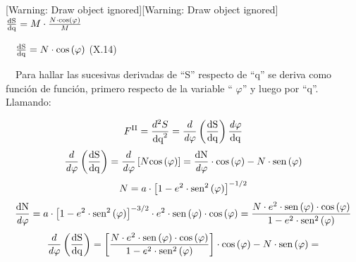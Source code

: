 \documentclass{tufte-book}
\newcommand\normalsubformula[1]{\text{\mathversion{normal}$#1$}}
\begin{document}
[Warning: Draw object ignored][Warning: Draw object ignored]\ \ 
${\frac{\normalsubformula{\text{dS}}}{\normalsubformula{\text{dq}}}=M\cdot
{\frac{N\cdot \text{cos}\left(\varphi \right)}{M}}}$

\ \ 
${\frac{\normalsubformula{\text{dS}}}{\normalsubformula{\text{dq}}}=N\cdot
\text{cos}\left(\varphi \right)}$  (X.14)

\ \ Para hallar las sucesivas derivadas de
{\textquotedblleft}S{\textquotedblright} respecto de
{\textquotedblleft}q{\textquotedblright} se deriva como función de
función, primero respecto de la variable {\textquotedblleft}
${\varphi }${\textquotedblright} y luego por
{\textquotedblleft}q{\textquotedblright}. Llamando:

\begin{equation*}
{F^{{\normalsubformula{\text{II}}}}=\frac{d^{{2}}S}{\normalsubformula{\text{dq}}^{{2}}}=\frac{d}{\mathit{d\varphi
}}\left(\frac{\normalsubformula{\text{dS}}}{\normalsubformula{\text{dq}}}\right)\frac{\mathit{d\varphi
}}{\normalsubformula{\text{dq}}}}
\end{equation*}
\begin{equation*}
{\frac{d}{\mathit{d\varphi
}}\left(\frac{\normalsubformula{\text{dS}}}{\normalsubformula{\text{dq}}}\right)=\frac{d}{\mathit{d\varphi
}}\left[N\text{cos}\left(\varphi
\right)\right]=\frac{\normalsubformula{\text{dN}}}{\mathit{d\varphi
}}\cdot \text{cos}\left(\varphi \right)-N\cdot
\normalsubformula{\text{sen}}\left(\varphi \right)}
\end{equation*}
\begin{equation*}
{N=a\cdot \left[1-e^{{2}}\cdot
\normalsubformula{\text{sen}}^{{2}}\left(\varphi
\right)\right]^{{-1/2}}}
\end{equation*}
\begin{equation*}
{\frac{\normalsubformula{\text{dN}}}{\mathit{d\varphi }}=a\cdot
\left[1-e^{{2}}\cdot \normalsubformula{\text{sen}}^{{2}}\left(\varphi
\right)\right]^{{-3/2}}\cdot e^{{2}}\cdot
\normalsubformula{\text{sen}}\left(\varphi \right)\cdot
\text{cos}\left(\varphi \right)=\frac{N\cdot e^{{2}}\cdot
\normalsubformula{\text{sen}}\left(\varphi \right)\cdot
\text{cos}\left(\varphi \right)}{1-e^{{2}}\cdot
\normalsubformula{\text{sen}}^{{2}}\left(\varphi \right)}}
\end{equation*}
\begin{equation*}
{\frac{d}{\mathit{d\varphi
}}\left(\frac{\normalsubformula{\text{dS}}}{\normalsubformula{\text{dq}}}\right)=\left[\frac{N\cdot
e^{{2}}\cdot \normalsubformula{\text{sen}}\left(\varphi \right)\cdot
\text{cos}\left(\varphi \right)}{1-e^{{2}}\cdot
\normalsubformula{\text{sen}}^{{2}}\left(\varphi \right)}\right]\cdot
\text{cos}\left(\varphi \right)-N\cdot
\normalsubformula{\text{sen}}\left(\varphi \right)=}
\end{equation*}
\end{document}
